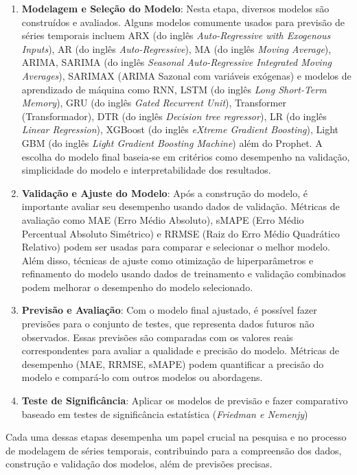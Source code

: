 \begin{enumerate}[start=1, label={\textbf{Etapa} \arabic*}]
	\item \label{etp:5} \textbf{Modelagem e Seleção do Modelo}: Nesta etapa, diversos modelos são construídos e avaliados. Alguns modelos comumente usados para previsão de séries temporais incluem ARX (do inglês \textit{Auto-Regressive with Exogenous Inputs}), AR (do inglês \textit{Auto-Regressive}), MA (do inglês \textit{Moving Average}), ARIMA, SARIMA (do inglês \textit{Seasonal Auto-Regressive Integrated Moving Averages}), SARIMAX (ARIMA Sazonal com variáveis exógenas) e modelos de aprendizado de máquina como RNN, LSTM (do inglês \textit{Long Short-Term Memory}), GRU (do inglês \textit{Gated Recurrent Unit}), Transformer (Transformador), DTR (do inglês \textit{Decision tree regressor}), LR (do inglês \textit{Linear Regression}), XGBoost (do inglês \textit{eXtreme Gradient Boosting}), Light GBM (do inglês \textit{Light Gradient Boosting Machine}) além do Prophet. A escolha do modelo final baseia-se em critérios como desempenho na validação, simplicidade do modelo e interpretabilidade dos resultados.
	
	\item \label{etp:6} \textbf{Validação e Ajuste do Modelo}: Após a construção do modelo, é importante avaliar seu desempenho usando dados de validação. Métricas de avaliação como MAE (Erro Médio Absoluto), sMAPE (Erro Médio Percentual Absoluto Simétrico) e RRMSE (Raiz do Erro Médio Quadrático Relativo) podem ser usadas para comparar e selecionar o melhor modelo. Além disso, técnicas de ajuste como otimização de hiperparâmetros e refinamento do modelo usando dados de treinamento e validação combinados podem melhorar o desempenho do modelo selecionado.
	
	\item \label{etp:7} \textbf{Previsão e Avaliação}: Com o modelo final ajustado, é possível fazer previsões para o conjunto de testes, que representa dados futuros não observados. Essas previsões são comparadas com os valores reais correspondentes para avaliar a qualidade e precisão do modelo. Métricas de desempenho (MAE, RRMSE, sMAPE) podem quantificar a precisão do modelo e compará-lo com outros modelos ou abordagens.
	
	\item \label{etp:8} \textbf{Teste de Significância}: Aplicar os modelos de previsão e fazer comparativo baseado em testes de significância estatística (\textit{Friedman e Nemenjy})

	
\end{enumerate}

Cada uma dessas etapas desempenha um papel crucial na pesquisa e no processo de modelagem de séries temporais, contribuindo para a compreensão dos dados, construção e validação dos modelos, além de previsões precisas.




    